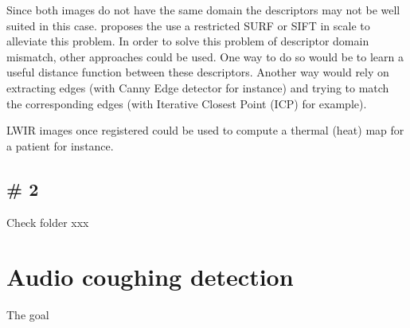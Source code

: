 \documentclass[10pt]{article}
\begin{document}
            Since both images do not have the same domain the descriptors may not be well suited in this case.
            \cite{huo2011multilevel} proposes the use a restricted SURF or SIFT in scale to alleviate this problem.
            In order to solve this problem of descriptor domain mismatch, other approaches could be used.
            One way to do so would be to learn a useful distance function between these descriptors.
            Another way would rely on extracting edges (with Canny Edge detector for instance) and trying to match the corresponding edges (with Iterative Closest Point (ICP) for example).

            LWIR images once registered could be used to compute a thermal (heat) map for a patient for instance.
        
        \subsection*{\# 2}
            Check folder xxx

    \section*{Audio coughing detection}
        The goal 
    
    
\end{document}
